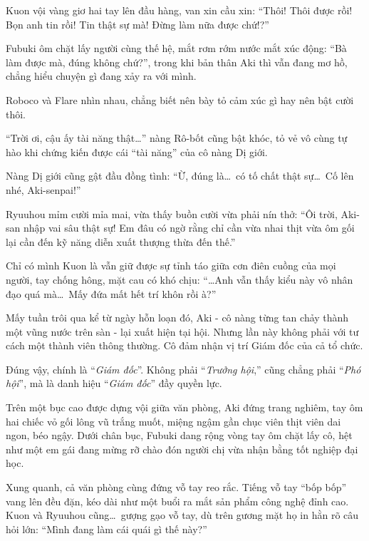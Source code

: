\documentclass[../main.tex]{subfiles}
\begin{document}
Kuon vội vàng giơ hai tay lên đầu hàng, van xin cầu xin: ``Thôi! Thôi được rồi! Bọn anh tin rồi! Tin thật sự mà! Đừng làm nữa được chứ!?''

Fubuki ôm chặt lấy người cùng thế hệ, mắt rơm rớm nước mắt xúc động: ``Bà làm được mà, đúng không chứ?'', trong khi bản thân Aki thì vẫn đang mơ hồ, chẳng hiểu chuyện gì đang xảy ra với mình.

Roboco và Flare nhìn nhau, chẳng biết nên bày tỏ cảm xúc gì hay nên bật cười thôi.

``Trời ơi, cậu ấy tài năng thật\dots'' nàng Rô-bốt cũng bật khóc, tỏ vẻ vô cùng tự hào khi chứng kiến được cái ``tài năng'' của cô nàng Dị giới.

Nàng Dị giới cũng gật đầu đồng tình: ``Ừ, đúng là\dots\ có tố chất thật sự\dots\ Cố lên nhé, Aki-senpai!''

Ryuuhou mỉm cười mỉa mai, vừa thấy buồn cười vừa phải nín thở: ``Ôi trời, Aki-san nhập vai sâu thật sự! Em đâu có ngờ rằng chỉ cần vừa nhai thịt vừa ôm gối lại cần đến kỹ năng diễn xuất thượng thừa đến thế.''

Chỉ có mình Kuon là vẫn giữ được sự tỉnh táo giữa cơn điên cuồng của mọi người, tay chống hông, mặt cau có khó chịu: ``\dots Anh vẫn thấy kiểu này vô nhân đạo quá mà\dots\ Mấy đứa mất hết trí khôn rồi à?''

\ct

Mấy tuần trôi qua kể từ ngày hỗn loạn đó, Aki - cô nàng từng tan chảy thành một vũng nước trên sàn - lại xuất hiện tại hội. Nhưng lần này không phải với tư cách một thành viên thông thường.  Cô đảm nhận vị trí Giám đốc của cả tổ chức.

Đúng vậy, chính là ``\emph{Giám đốc}''. Không phải ``\emph{Trưởng hội},'' cũng chẳng phải ``\emph{Phó hội}'', mà là danh hiệu ``\emph{Giám đốc}'' đầy quyền lực.

Trên một bục cao được dựng vội giữa văn phòng, Aki đứng trang nghiêm, tay ôm hai chiếc vỏ gối lông vũ trắng muốt, miệng ngậm gần chục viên thịt viên dai ngon, béo ngậy. Dưới chân bục, Fubuki dang rộng vòng tay ôm chặt lấy cô, hệt như một em gái đang mừng rỡ chào đón người chị vừa nhận bằng tốt nghiệp đại học.


Xung quanh, cả văn phòng cùng đứng vỗ tay reo rắc. Tiếng vỗ tay ``bốp bốp'' vang lên đều đặn, kéo dài như một buổi ra mắt sản phẩm công nghệ đỉnh cao. Kuon và Ryuuhou cũng\dots\ gượng gạo vỗ tay, dù trên gương mặt họ in hằn rõ câu hỏi lớn: ``Mình đang làm cái quái gì thế này?''
\end{document}
